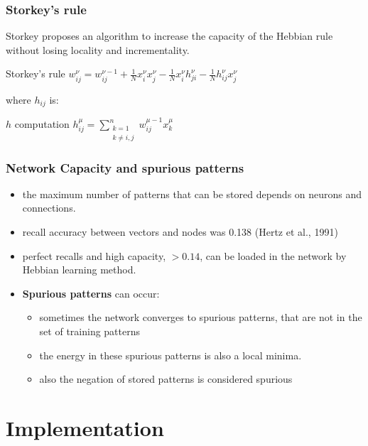 \documentclass{beamer}
\begin{document}

\begin{frame}
\frametitle{Storkey's rule}
Storkey proposes an algorithm to increase the capacity of the Hebbian rule without losing locality and incrementality.
\begin{block}{Storkey's rule}
$w_{ij}^{\nu} = w_{ij}^{\nu-1}+ \frac{1}{N} x_i^{\nu}x_j^{\nu} - \frac{1}{N} x_i^{\nu}h_{ji}^{\nu} - \frac{1}{N} h_{ij}^{\nu}x_j^{\nu}$
\end{block}
where $h_{ij}$ is:
\begin{block}{$h$ computation}
$h_{ij}^{\mu} = \sum_{\substack{k=1\\k\neq i,j}}^n w_{ij}^{\mu-1} x_k^{\mu}$
\end{block}
\end{frame}


\begin{frame}
\frametitle{Network Capacity and spurious patterns}
\begin{itemize}
\item the maximum number of patterns that can be stored depends on neurons and connections.
\item recall accuracy between vectors and nodes was 0.138 (Hertz et al., 1991)
\item perfect recalls and high capacity, $>0.14$, can be loaded in the network by Hebbian learning method.
\item\textbf{Spurious patterns} can occur: \begin{itemize}
\item sometimes the network converges to spurious patterns, that are not in the set of training patterns
\item the energy in these spurious patterns is also a local minima. 
\item also the negation of stored patterns is considered spurious
\end{itemize}
\end{itemize}
\end{frame}





\section{Implementation}
\end{document}

